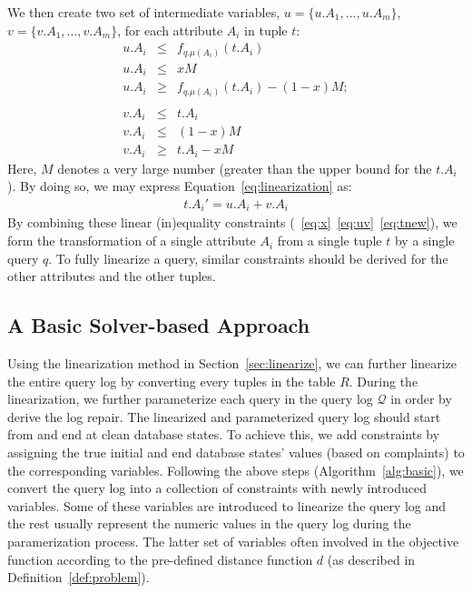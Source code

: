 We then create two set of intermediate variables,
$u=\{u.A_1, ..., u.A_m\}$, $v = \{v.A_1, ..., v.A_m\}$, 
for each attribute $A_i$ in tuple $t$:
\begin{eqnarray}
\label{eq:uv}
u.A_i &\leq & f_{q.\mu(A_i)} (t.A_i) \nonumber\\
u.A_i &\leq & xM \nonumber\\ 
u.A_i &\geq & f_{q.\mu(A_i)} (t.A_i) - (1-x)M ; \nonumber \\\nonumber \\
v.A_i &\leq & t.A_i \nonumber\\
v.A_i &\leq & (1-x)M \nonumber\\
v.A_i &\geq & t.A_i - xM
\end{eqnarray}
Here, $M$ denotes a very large number (greater than the upper bound for the $t.A_i$).
By doing so, we may express Equation~\ref{eq:linearization} as:
\begin{eqnarray}
\label{eq:tnew}
t.A_i' = u.A_i + v.A_i
\end{eqnarray}
By combining these linear (in)equality constraints 
(~\ref{eq:x}~\ref{eq:uv}~\ref{eq:tnew}), we form the transformation 
of a single attribute $A_i$ from a single tuple $t$ 
by a single query $q$. To fully linearize a query, 
similar constraints should be
derived for the other attributes and the other tuples. 

\subsection{A Basic Solver-based Approach}
\label{sec:milp}
Using the linearization
 method in Section~\ref{sec:linearize}, we can further
linearize
the entire query log by converting every tuples in the table $R$. 
During the linearization, we further parameterize each
query in the query log $\mathcal{Q}$ in order by 
derive the log repair. 
The linearized and parameterized query log
should start from and end at clean database states.
To achieve this, we add constraints
by assigning the true initial and end database 
states' values (based on complaints) 
to the corresponding variables. 
Following the above steps 
(Algorithm~\ref{alg:basic}), we convert the 
query log into a collection of constraints 
with newly introduced variables. 
Some of these variables
are introduced to linearize the query log 
and the rest usually
represent the numeric values in the query log
during the paramerization process. 
The latter set of 
variables often involved in the objective function 
according to the pre-defined distance function $d$ 
(as described in Definition~\ref{def:problem}). \\

